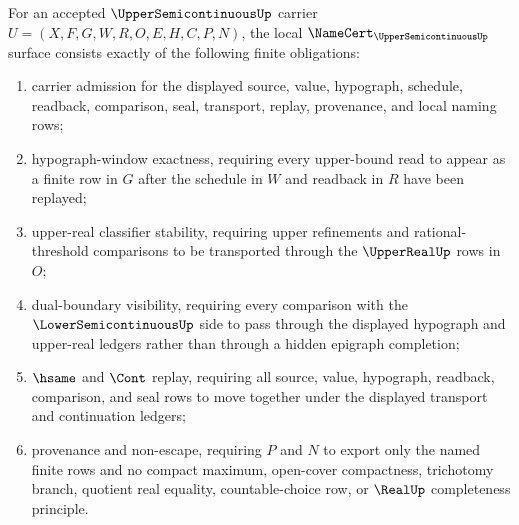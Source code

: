\begin{theorem}
\label{thm:upper-semicontinuous-namecert-obligations}
For an accepted $\UpperSemicontinuousUp$ carrier
$U=(X,F,G,W,R,O,E,H,C,P,N)$, the local
$\NameCert_{\UpperSemicontinuousUp}$ surface consists exactly of the following
finite obligations:
\begin{enumerate}
\item carrier admission for the displayed source, value, hypograph, schedule,
  readback, comparison, seal, transport, replay, provenance, and local naming
  rows;
\item hypograph-window exactness, requiring every upper-bound read to appear
  as a finite row in $G$ after the schedule in $W$ and readback in $R$ have
  been replayed;
\item upper-real classifier stability, requiring upper refinements and
  rational-threshold comparisons to be transported through the $\UpperRealUp$
  rows in $O$;
\item dual-boundary visibility, requiring every comparison with the
  $\LowerSemicontinuousUp$ side to pass through the displayed hypograph and
  upper-real ledgers rather than through a hidden epigraph completion;
\item $\hsame$ and $\Cont$ replay, requiring all source, value, hypograph,
  readback, comparison, and seal rows to move together under the displayed
  transport and continuation ledgers;
\item provenance and non-escape, requiring $P$ and $N$ to export only the
  named finite rows and no compact maximum, open-cover compactness,
  trichotomy branch, quotient real equality, countable-choice row, or
  $\RealUp$ completeness principle.
\end{enumerate}
\end{theorem}
